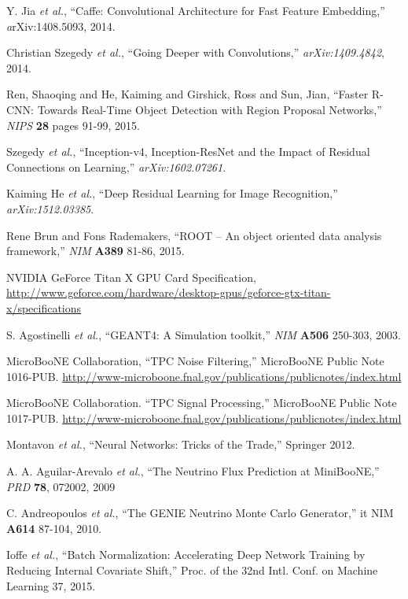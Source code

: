 \documentclass[11pt,a4paper]{article}
\begin{document}
\begin{thebibliography}{9}
 Y. Jia {\it et al.}, ``Caffe: Convolutional Architecture for Fast Feature Embedding,'' {\emph arXiv:1408.5093}, 2014.
 
Christian Szegedy {\it et al.}, ``Going Deeper with Convolutions,''
  \emph{arXiv:1409.4842}, 2014.

Ren, Shaoqing and He, Kaiming and Girshick, Ross and Sun, Jian,
``Faster R-CNN: Towards Real-Time Object Detection with Region Proposal Networks,''
\emph{NIPS} \textbf{28} pages 91-99, 2015.

Szegedy {\it et al.}, ``Inception-v4, Inception-ResNet and the Impact of Residual Connections on Learning,'' \emph{arXiv:1602.07261}.

  Kaiming He {\it et al.}, ``Deep Residual Learning for Image Recognition,'' \emph{arXiv:1512.03385}.

Rene Brun and Fons Rademakers,
``ROOT -- An object oriented data analysis framework,''
{\it NIM} {\bf A389} 81-86, 2015.

NVIDIA GeForce Titan X GPU Card Specification, \protect\url{http://www.geforce.com/hardware/desktop-gpus/geforce-gtx-titan-x/specifications}

S. Agostinelli {\it et al.}, ``GEANT4: A Simulation toolkit,''
{\it NIM} {\bf A506} 250-303, 2003.

MicroBooNE Collaboration, ``TPC Noise Filtering,'' MicroBooNE Public Note 1016-PUB.
\protect\url{http://www-microboone.fnal.gov/publications/publicnotes/index.html}

MicroBooNE Collaboration. ``TPC Signal Processing,'' MicroBooNE Public Note 1017-PUB.
\protect\url{http://www-microboone.fnal.gov/publications/publicnotes/index.html}

Montavon {\it et al.}, ``Neural Networks: Tricks of the Trade,'' Springer 2012.

A. A. Aguilar-Arevalo {\it et al.}, ``The Neutrino Flux Prediction at MiniBooNE,'' \emph{PRD} \textbf{78}, 072002, 2009

C. Andreopoulos {\it et al.}, ``The GENIE Neutrino Monte Carlo Generator,''
{it NIM} {\bf A614} 87-104, 2010.
  
  Ioffe {\it et al.}, ``Batch Normalization: Accelerating Deep Network Training by Reducing Internal Covariate Shift,'' Proc. of the 32nd Intl. Conf. on Machine Learning 37, 2015.


\end{thebibliography}
\end{document}
